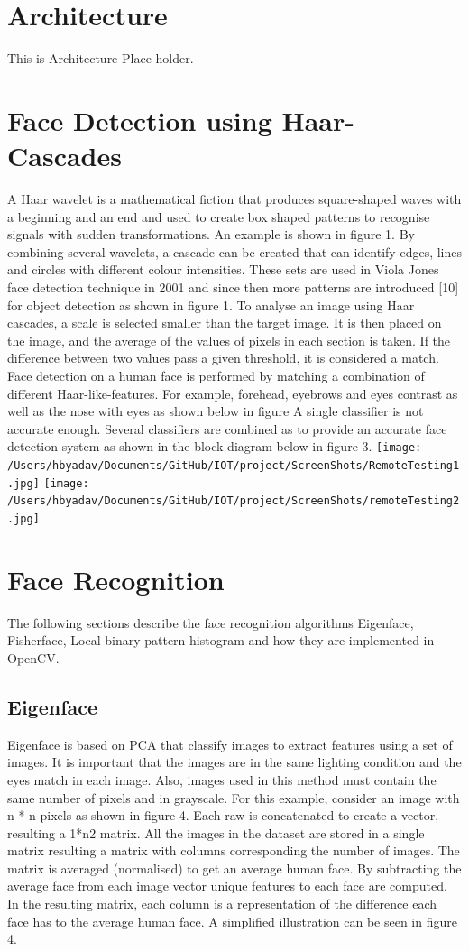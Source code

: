 \documentclass[11pt]{article}
\begin{document}
\section{Architecture}
This is Architecture Place holder.

\section{Face Detection using Haar-Cascades}
A Haar wavelet is a mathematical fiction that produces square-shaped waves with a beginning and an end
and used to create box shaped patterns to recognise signals with sudden transformations. An example is
shown in figure 1. By combining several wavelets, a cascade can be created that can identify edges, lines
and circles with different colour intensities. These sets are used in Viola Jones face detection technique
in 2001 and since then more patterns are introduced [10] for object detection as shown in figure 1.
To analyse an image using Haar cascades, a scale is selected smaller than the target image. It is then
placed on the image, and the average of the values of pixels in each section is taken. If the difference
between two values pass a given threshold, it is considered a match. Face detection on a human face is
performed by matching a combination of different Haar-like-features. For example, forehead, eyebrows
and eyes contrast as well as the nose with eyes as shown below in figure A single classifier is not accurate
enough. Several classifiers are combined as to provide an accurate face detection system as shown in the
block diagram below in figure 3.
\texttt{[image: /Users/hbyadav/Documents/GitHub/IOT/project/ScreenShots/RemoteTesting1.jpg]}
\texttt{[image: /Users/hbyadav/Documents/GitHub/IOT/project/ScreenShots/remoteTesting2.jpg]}

\section{Face Recognition}
The following sections describe the face recognition algorithms Eigenface, Fisherface, Local binary pattern
histogram and how they are implemented in OpenCV.
\subsection{Eigenface}
Eigenface is based on PCA that classify images to extract features using a set of images. It is important
that the images are in the same lighting condition and the eyes match in each image. Also, images used
in this method must contain the same number of pixels and in grayscale. For this example, consider an
image with n * n pixels as shown in figure 4. Each raw is concatenated to create a vector, resulting a
1*n2 matrix. All the images in the dataset are stored in a single matrix resulting a matrix with columns
corresponding the number of images. The matrix is averaged (normalised) to get an average human face.
By subtracting the average face from each image vector unique features to each face are computed. In
the resulting matrix, each column is a representation of the difference each face has to the average human
face. A simplified illustration can be seen in figure 4.
\end{document}
